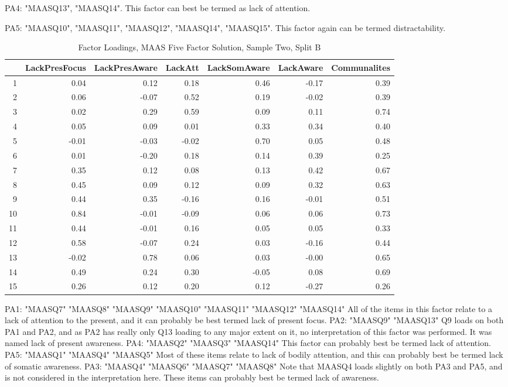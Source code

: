 \documentclass{article}
\begin{document}
PA4: "MAASQ13", "MAASQ14".  This factor can best be termed as lack of attention.

PA5: "MAASQ10", "MAASQ11", "MAASQ12", "MAASQ14", "MAASQ15".  This factor again can be termed distractability.

\begin{table}[ht]
\centering
\begin{tabular}{rrrrrrr}
  \hline
 & LackPresFocus & LackPresAware & LackAtt & LackSomAware & LackAware & Communalites \\ 
  \hline
1 & 0.04 & 0.12 & 0.18 & 0.46 & -0.17 & 0.39 \\ 
  2 & 0.06 & -0.07 & 0.52 & 0.19 & -0.02 & 0.39 \\ 
  3 & 0.02 & 0.29 & 0.59 & 0.09 & 0.11 & 0.74 \\ 
  4 & 0.05 & 0.09 & 0.01 & 0.33 & 0.34 & 0.40 \\ 
  5 & -0.01 & -0.03 & -0.02 & 0.70 & 0.05 & 0.48 \\ 
  6 & 0.01 & -0.20 & 0.18 & 0.14 & 0.39 & 0.25 \\ 
  7 & 0.35 & 0.12 & 0.08 & 0.13 & 0.42 & 0.67 \\ 
  8 & 0.45 & 0.09 & 0.12 & 0.09 & 0.32 & 0.63 \\ 
  9 & 0.44 & 0.35 & -0.16 & 0.16 & -0.01 & 0.51 \\ 
  10 & 0.84 & -0.01 & -0.09 & 0.06 & 0.06 & 0.73 \\ 
  11 & 0.44 & -0.01 & 0.16 & 0.05 & 0.05 & 0.33 \\ 
  12 & 0.58 & -0.07 & 0.24 & 0.03 & -0.16 & 0.44 \\ 
  13 & -0.02 & 0.78 & 0.06 & 0.03 & -0.00 & 0.65 \\ 
  14 & 0.49 & 0.24 & 0.30 & -0.05 & 0.08 & 0.69 \\ 
  15 & 0.26 & 0.12 & 0.20 & 0.12 & -0.27 & 0.26 \\ 
   \hline
\end{tabular}
\caption{Factor Loadings, MAAS Five Factor Solution, Sample Two, Split B} 
\label{tab:hom2cmaasfact5}
\end{table}
PA1: "MAASQ7"  "MAASQ8"  "MAASQ9"  "MAASQ10" "MAASQ11" "MAASQ12" "MAASQ14"
All of the items in this factor relate to a lack of attention to the present, and it can probably be best termed lack of present focus. 
PA2: "MAASQ9"  "MAASQ13"
Q9 loads on both PA1 and PA2, and as PA2 has really only Q13 loading to any major extent on it, no interpretation of this factor was performed. It was named lack of present awareness. 
PA4: "MAASQ2"  "MAASQ3"  "MAASQ14"
This factor can probably best be termed lack of attention. 
PA5: "MAASQ1" "MAASQ4" "MAASQ5"
Most of these items relate to lack of bodily attention, and this can probably best be termed lack of somatic awareness. 
PA3: "MAASQ4" "MAASQ6" "MAASQ7" "MAASQ8"
Note that MAASQ4 loads slightly on both PA3 and PA5, and is not considered in the interpretation here. These items can probably best be termed lack of awareness. 
\end{document}
